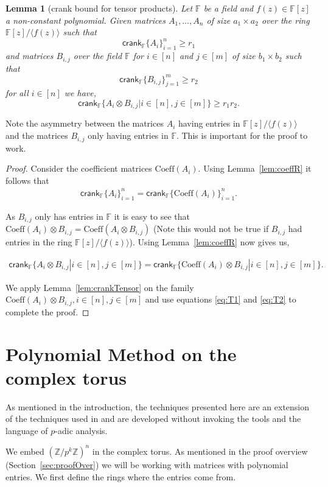 \documentclass[11pt]{article}
\numberwithin{equation}{section}
\newtheorem{lem}[thm]{Lemma}
\def\F{{\mathbb{F}}}
\def\Z{{\mathbb{Z}}}
\def\crank{\textsf{crank}}
\def\Coeff{\text{Coeff}}
\begin{document}
\begin{lem}[crank bound for tensor products]\label{lem:crankTensorProduct}
Let $\F$ be a field and $f(z)\in \F[z]$ a non-constant polynomial. Given matrices $A_1,\hdots,A_n$ of size $a_1\times a_2$ over the ring $\F[z]/\langle f(z)\rangle$ such that 
{\em$$\crank_\F\{A_i\}_{i=1}^n\ge r_1$$} 
and matrices $B_{i,j}$ over the field $\F$ for $i\in [n]$ and $j\in [m]$ of size $b_1\times b_2$ such that 
{\em $$\crank_\F\{B_{i,j}\}_{j=1}^m\ge r_2$$}
for all $i\in [n]$ we have,
\em{$$\crank_\F\{A_i\otimes B_{i,j}|i\in [n],j\in[m]\}\ge r_1r_2.$$}
\end{lem}
Note the asymmetry between the matrices $A_i$ having entries in $\F[z]/\langle f(z)\rangle$ and the matrices $B_{i,j}$ only having entries in $\F$. This is important for the proof to work.
\begin{proof}
Consider the coefficient matrices $\Coeff(A_i)$. Using Lemma~\ref{lem:coeffR} it follows that 
\begin{align}\label{eq:T1}
    \crank_\F\{A_i\}_{i=1}^n=\crank_\F\{\Coeff(A_i)\}_{i=1}^n.
\end{align}

As $B_{i,j}$ only has entries in $\F$ it is easy to see that $\Coeff(A_i)\otimes B_{i,j}=\Coeff(A_i\otimes B_{i,j})$ (Note this would not be true if $B_{i,j}$ had entries in the ring $\F[z]/\langle f(z)\rangle$). Using Lemma~\ref{lem:coeffR} now gives us,

\begin{align}\label{eq:T2}
    \crank_\F\{A_i\otimes B_{i,j}|i\in [n],j\in[m]\}=\crank_\F\{\Coeff(A_i)\otimes B_{i,j}|i\in [n],j\in[m]\}.
\end{align}

We apply Lemma~\ref{lem:crankTensor} on the family $\Coeff(A_i)\otimes B_{i,j},i\in [n],j\in[m]$ and use equations \eqref{eq:T1} and \eqref{eq:T2} to complete the proof.
\end{proof}

\section{Polynomial Method on the complex torus}\label{sec:PreAr}
As mentioned in the introduction, the techniques presented here are an extension of the techniques used in \cite{arsovski2021padic} and are developed without invoking the tools and the language of $p$-adic analysis.

We embed $(\Z/p^k\Z)^n$ in the complex torus. As mentioned in the proof overview (Section~\ref{sec:proofOver}) we will be working with matrices with polynomial entries. We first define the rings where the entries come from.
\end{document}
